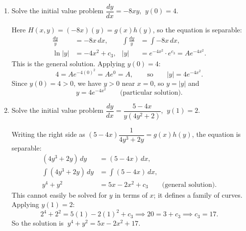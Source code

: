 \documentclass[10pt]{article}
\begin{document}
\begin{enumerate}[leftmargin=*, label=\numbox{\arabic*}]

\item
    \begin{problem}[5cm]
        Solve the initial value problem \(\dfrac{dy}{dx} = -8xy\), \(\ y(0) = 4\).
    \end{problem}
    \begin{solution}
        Here \(H(x,y) = (-8x)(y) = g(x)h(y)\), so the equation is separable:
        \[
        \begin{aligned}
            \frac{dy}{y} &= -8x\,dx, &
            \int \frac{dy}{y} &= \int -8x\,dx, \\
            \ln|y| &= -4x^2 + c_3, &
            |y| &= e^{-4x^2}\cdot e^{c_3} = A e^{-4x^2}.
        \end{aligned}
        \]
        This is the general solution. Applying \(y(0) = 4\):
        \[
            4 = A e^{-4(0)^2} = A e^0 = A,
            \qquad\text{so}\qquad |y| = 4 e^{-4x^2}.
        \]
        Since \(y(0) = 4 > 0\), we have \(y > 0\) near \(x = 0\), so \(y = |y|\) and
        \[
            y = 4 e^{-4x^2} \qquad\text{(particular solution).}
        \]
    \end{solution}

\item
    \begin{problem}[6cm]
        Solve the initial value problem \(\dfrac{dy}{dx} = \dfrac{5 - 4x}{y(4y^2 + 2)}\), \(\ y(1) = 2\).
    \end{problem}
    \begin{solution}
        Writing the right side as \((5 - 4x)\dfrac{1}{4y^3 + 2y} = g(x)h(y)\), the equation is separable:
        \[
        \begin{aligned}
            (4y^3 + 2y)\,dy &= (5 - 4x)\,dx, \\
            \int (4y^3 + 2y)\,dy &= \int (5 - 4x)\,dx, \\
            y^4 + y^2 &= 5x - 2x^2 + c_3 \qquad\text{(general solution).}
        \end{aligned}
        \]
        This cannot easily be solved for \(y\) in terms of \(x\); it defines a family of curves.
        Applying \(y(1) = 2\):
        \[
            2^4 + 2^2 = 5(1) - 2(1)^2 + c_3
            \implies 20 = 3 + c_3 \implies c_3 = 17.
        \]
        So the solution is \(\ y^4 + y^2 = 5x - 2x^2 + 17\).
    \end{solution}


\end{enumerate}
\end{document}
